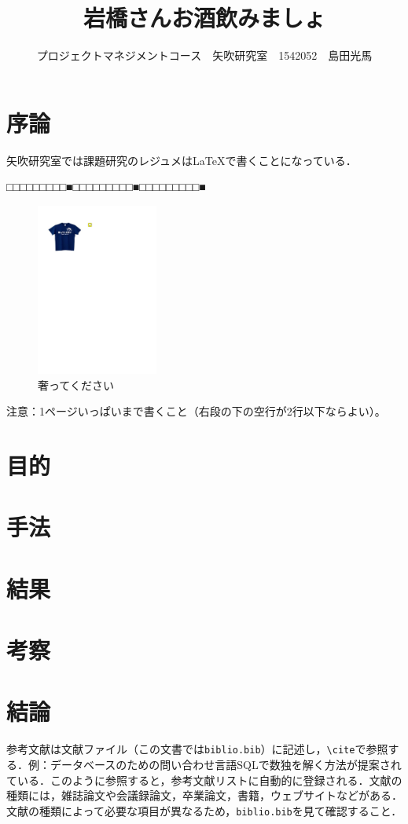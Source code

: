 \documentclass[uplatex,twocolumn,dvipdfmx]{jsarticle}
\title{\vspace{-5mm}\fontsize{14pt}{0pt}\selectfont 岩橋さんお酒飲みましょ}
\author{\normalsize プロジェクトマネジメントコース　矢吹研究室　1542052　島田光馬}
\date{}
\begin{document}
\fontsize{10.5pt}{\baselineskip}\selectfont
\maketitle





\section{序論}

矢吹研究室では課題研究のレジュメは\LaTeX で書くことになっている．

\noindent
□□□□□□□□□■□□□□□□□□□■□□□□□□□□□■

\begin{figure}[h]
\centering
\includegraphics[width=4cm,clip]{Book1.pdf}
\caption{奢ってください}\label{サンプル図}
\end{figure}


\noindent
注意：1ページいっぱいまで書くこと（右段の下の空行が2行以下ならよい）。

\section{目的}

\section{手法}

\section{結果}

\section{考察}

\section{結論}

参考文献は文献ファイル（この文書では\verb|biblio.bib|）に記述し，\verb|\cite|で参照する．例：データベースのための問い合わせ言語SQLで数独を解く方法が提案されている\cite{yabuki2011}．このように参照すると，参考文献リストに自動的に登録される．文献の種類には，雑誌論文\cite{yabuki2011}や会議録論文\cite{yabuki2013}，卒業論文\cite{kubo2014}，書籍\cite{okumura2013}，ウェブサイト\cite{self}などがある．文献の種類によって必要な項目が異なるため，\verb|biblio.bib|を見て確認すること．


\end{document}
